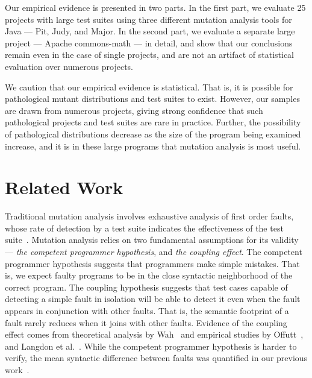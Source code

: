 \documentclass[conference]{IEEEtran}
\begin{document}
Our empirical evidence is presented in two parts. In the first part, we
evaluate 25 projects with large test suites using three
different mutation analysis tools for Java --- Pit, Judy, and Major. In the
second part, we evaluate a separate large project --- Apache
commons-math --- in detail, and show that our conclusions remain even
in the case of single projects, and are not an artifact of statistical evaluation
over numerous projects.

We caution that our empirical evidence is statistical. That is, it is
possible for pathological mutant distributions and test suites to exist.
However, our samples are drawn from numerous projects, giving 
strong confidence that such pathological projects and test suites
are rare in practice. Further, the possibility of pathological distributions
decrease as the size of the program being examined increase, and it is in these
large programs that mutation analysis is most useful.




\section{Related Work}
\label{sec:related}
Traditional mutation analysis involves exhaustive analysis of first order
faults, whose rate of detection by a test suite indicates the effectiveness
of the test suite~\cite{demillo1978hints}.  Mutation analysis relies on two fundamental
assumptions for its validity --- \emph{the competent programmer hypothesis},
and \emph{the coupling effect}. The competent programmer hypothesis suggests
that programmers make simple mistakes. That is,
we expect faulty programs to be in the close syntactic neighborhood of the
correct program. The coupling hypothesis suggests that test cases capable of
detecting a simple fault in isolation will be able to detect it even when the
fault appears in conjunction with other faults. That is, the semantic footprint
of a fault rarely reduces when it joins with other faults. 
Evidence of the coupling effect comes from theoretical analysis by
Wah~\cite{wah2000atheoretical,wah2003ananalysis}  and empirical studies by
Offutt~\cite{offutt1989thecoupling,offutt1992investigations}, and
Langdon et al.~\cite{langdon2010efficient}.
While the competent programmer hypothesis is harder to verify, the mean syntactic
difference between faults was quantified in our previous work~\cite{gopinath2014mutations}.
\end{document}
